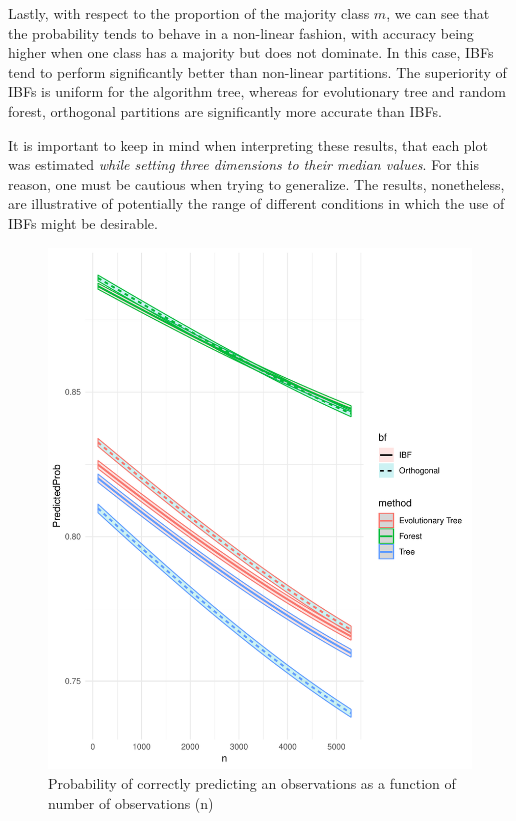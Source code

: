 \documentclass[]{elsarticle} %
\makeatletter
\def\maxwidth{\ifdim\Gin@nat@width>\linewidth\linewidth
\else\Gin@nat@width\fi}
\let\Oldincludegraphics\includegraphics
\renewcommand{\includegraphics}[1]{\Oldincludegraphics[width=\maxwidth]{#1}}
\makeatother
\begin{document}
Lastly, with respect to the proportion of the majority class \(m\), we
can see that the probability tends to behave in a non-linear fashion,
with accuracy being higher when one class has a majority but does not
dominate. In this case, IBFs tend to perform significantly better than
non-linear partitions. The superiority of IBFs is uniform for the
algorithm tree, whereas for evolutionary tree and random forest,
orthogonal partitions are significantly more accurate than IBFs.

It is important to keep in mind when interpreting these results, that
each plot was estimated \emph{while setting three dimensions to their
median values}. For this reason, one must be cautious when trying to
generalize. The results, nonetheless, are illustrative of potentially
the range of different conditions in which the use of IBFs might be
desirable.

\begin{figure}
\centering
\includegraphics{Trees_with_Base_Functions_v2_files/figure-latex/fig12-estimated-accuracy-n-1.pdf}
\caption{\label{fig:fig12-estimated-accuracy-n}Probability of correctly
predicting an observations as a function of number of observations (n)}
\end{figure}
\end{document}
